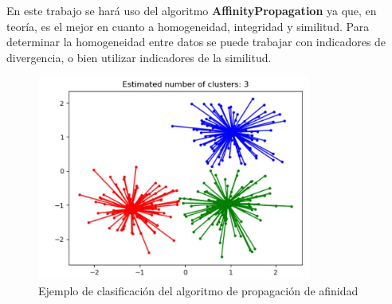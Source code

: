 \documentclass[a4paper, 12pt]{book}
\begin{document}
En este trabajo se hará uso del algoritmo \textbf{AffinityPropagation} ya que, en teoría, es el mejor en cuanto a homogeneidad, integridad y similitud. \cite{areed2020python}  Para determinar la homogeneidad entre datos se puede trabajar con indicadores de divergencia, o bien utilizar indicadores de la similitud. 

\begin{figure}[!htb]
    \centering
    \includegraphics[width=9cm, keepaspectratio]{img/affinitypropagation.jpg}
    \caption{Ejemplo de clasificación del algoritmo de propagación de afinidad}
    \label{fig:affinitypropagation}
\end{figure}


\end{document}
